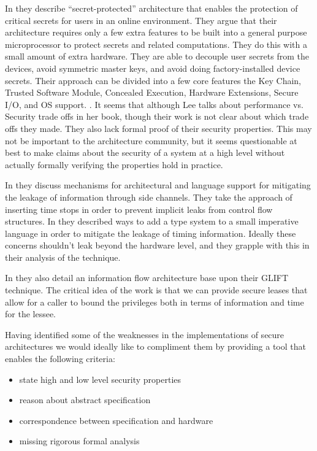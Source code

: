\documentclass[12pt, titlepage]{article}
\begin{document}
In \cite{lee05} they describe “secret-protected” architecture that enables the protection of critical secrets for users in an online environment. They argue that their architecture requires only a few extra features to be built into a general purpose microprocessor to protect secrets and related computations. They do this with a small amount of extra hardware. They are able to decouple user secrets from the devices, avoid symmetric master keys, and avoid doing factory-installed device secrets. Their approach can be divided into a few core features the Key Chain, Trusted Software Module, Concealed Execution, Hardware Extensions, Secure I/O, and OS support. \cite{PicoCoq2013:POPL}. It seems that although Lee talks about performance vs. Security trade offs in her book, though their work is not clear about which trade offs they made. They also lack formal proof of their security properties. This may not be important to the architecture community, but it seems questionable at best to make claims about the security of a system at a high level without actually formally verifying the properties hold in practice.

In \cite{blackboxed} \cite{languagebased} they discuss mechanisms for architectural and language support for mitigating the
leakage of information through side channels. They take the approach of inserting time stops in order to prevent implicit
leaks from control flow structures. In \cite{languagebased} they described ways to add a type system to a small imperative language in 
order to mitigate the leakage of timing information. Ideally these concerns shouldn't leak beyond the hardware level, and they grapple with this in their analysis of the technique. 

In \cite{exec-leases} they also detail an information flow architecture base upon their GLIFT technique. The critical idea of the work is that
we can provide secure leases that allow for a caller to bound the privileges both in terms of information and time for the lessee. 

Having identified some of the weaknesses in the implementations of secure architectures we would 
ideally like to compliment them by providing a tool that enables the following criteria:
\begin{itemize}
    \item state high and low level security properties
    \item reason about abstract specification
    \item correspondence between specification and hardware
    \item missing rigorous formal analysis
\end{itemize}
\end{document}
